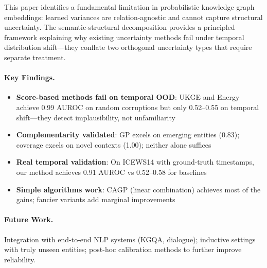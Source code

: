 
This paper identifies a fundamental limitation in probabilistic knowledge graph embeddings: learned variances are relation-agnostic and cannot capture structural uncertainty.
The semantic-structural decomposition provides a principled framework explaining why existing uncertainty methods fail under temporal distribution shift---they conflate two orthogonal uncertainty types that require separate treatment.

\paragraph{Key Findings.}
\begin{itemize}
    \item \textbf{Score-based methods fail on temporal OOD}: UKGE and Energy achieve 0.99 AUROC on random corruptions but only 0.52--0.55 on temporal shift---they detect implausibility, not unfamiliarity
    \item \textbf{Complementarity validated}: GP excels on emerging entities (0.83); coverage excels on novel contexts (1.00); neither alone suffices
    \item \textbf{Real temporal validation}: On ICEWS14 with ground-truth timestamps, our method achieves 0.91 AUROC vs 0.52--0.58 for baselines
    \item \textbf{Simple algorithms work}: CAGP (linear combination) achieves most of the gains; fancier variants add marginal improvements
\end{itemize}

\paragraph{Future Work.}
Integration with end-to-end NLP systems (KGQA, dialogue); inductive settings with truly unseen entities; post-hoc calibration methods to further improve reliability.
